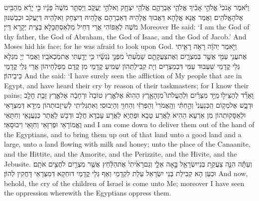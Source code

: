 {וַיֹּ֗אמֶר אָנֹכִי֙ אֱלֹהֵ֣י אָבִ֔יךָ אֱלֹהֵ֧י אַבְרָהָ֛ם אֱלֹהֵ֥י יִצְחָ֖ק וֵאלֹהֵ֣י יַעֲקֹ֑ב וַיַּסְתֵּ֤ר מֹשֶׁה֙ פָּנָ֔יו כִּ֣י יָרֵ֔א מֵהַבִּ֖יט אֶל\maqqaf הָאֱלֹהִֽים׃}
{וַאֲמַר אֲנָא אֱלָהָא דַּאֲבוּךְ אֱלָהֵיהּ דְּאַבְרָהָם אֱלָהֵיהּ דְּיִצְחָק וֵאלָהֵיהּ דְּיַעֲקֹב וּכְבַשִׁנּוּן מֹשֶׁה לְאַפּוֹהִי אֲרֵי דְּחֵיל מִלְּאִסְתַּכָּלָא בְּצֵית יְקָרָא דַּייָ׃}
{Moreover He said: ‘I am the God of thy father, the God of Abraham, the God of Isaac, and the God of Jacob.’ And Moses hid his face; for he was afraid to look upon God.}{}
{וַיֹּ֣אמֶר יְהֹוָ֔ה רָאֹ֥ה רָאִ֛יתִי אֶת\maqqaf עֳנִ֥י עַמִּ֖י אֲשֶׁ֣ר בְּמִצְרָ֑יִם וְאֶת\maqqaf צַעֲקָתָ֤ם שָׁמַ֙עְתִּי֙ מִפְּנֵ֣י נֹֽגְשָׂ֔יו כִּ֥י יָדַ֖עְתִּי אֶת\maqqaf מַכְאֹבָֽיו׃}
{וַאֲמַר יְיָ מִגְלָא גְּלֵי קֳדָמַי שִׁעְבּוּד עַמִּי דִּבְמִצְרָיִם וְיָת קְבִילַתְהוֹן שְׁמִיעַ קֳדָמַי מִן קֳדָם מַפְלְחֵיהוֹן אֲרֵי גְּלֵי קֳדָמַי כֵּיבֵיהוֹן׃}
{And the \lord\space said: ‘I have surely seen the affliction of My people that are in Egypt, and have heard their cry by reason of their taskmasters; for I know their pains;}{}
{וָאֵרֵ֞ד לְהַצִּיל֣וֹ \legarmeh  מִיַּ֣ד מִצְרַ֗יִם וּֽלְהַעֲלֹתוֹ֮ מִן\maqqaf הָאָ֣רֶץ הַהִוא֒ אֶל\maqqaf אֶ֤רֶץ טוֹבָה֙ וּרְחָבָ֔ה אֶל\maqqaf אֶ֛רֶץ זָבַ֥ת חָלָ֖ב וּדְבָ֑שׁ אֶל\maqqaf מְק֤וֹם הַֽכְּנַעֲנִי֙ וְהַ֣חִתִּ֔י וְהָֽאֱמֹרִי֙ וְהַפְּרִזִּ֔י וְהַחִוִּ֖י וְהַיְבוּסִֽי׃}
{וְאִתְגְּלִיתִי לְשֵׁיזָבוּתְהוֹן מִיְּדָא דְּמִצְרָאֵי וּלְאַסָּקוּתְהוֹן מִן אַרְעָא הַהִיא לַאֲרַע טָבָא וּפַתְיָא לַאֲרַע עָבְדָא חֲלָב וּדְבָשׁ לַאֲתַר כְּנַעֲנָאֵי וְחִתָּאֵי וֶאֱמוֹרָאֵי וּפְרִזָּאֵי וְחִוָּאֵי וִיבוּסָאֵי׃}
{and I am come down to deliver them out of the hand of the Egyptians, and to bring them up out of that land unto a good land and a large, unto a land flowing with milk and honey; unto the place of the Canaanite, and the Hittite, and the Amorite, and the Perizzite, and the Hivite, and the Jebusite.}{}
{וְעַתָּ֕ה הִנֵּ֛ה צַעֲקַ֥ת בְּנֵי\maqqaf יִשְׂרָאֵ֖ל בָּ֣אָה אֵלָ֑י וְגַם\maqqaf רָאִ֙יתִי֙ אֶת\maqqaf הַלַּ֔חַץ אֲשֶׁ֥ר מִצְרַ֖יִם לֹחֲצִ֥ים אֹתָֽם׃}
{וּכְעַן הָא קְבִילַת בְּנֵי יִשְׂרָאֵל עַלַת לִקְדָמַי וְאַף גְּלֵי קֳדָמַי דּוּחְקָא דְּמִצְרָאֵי דָּחֲקִין לְהוֹן׃}
{And now, behold, the cry of the children of Israel is come unto Me; moreover I have seen the oppression wherewith the Egyptians oppress them.}{}
